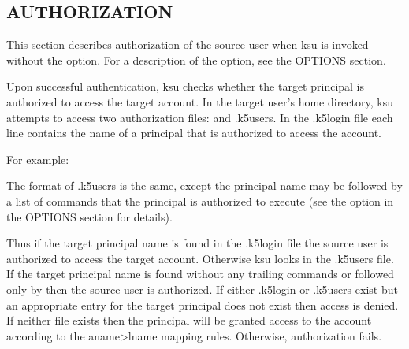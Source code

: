 \documentclass[letterpaper,10pt,english]{sphinxmanual}
\begin{document}
\subsection{AUTHORIZATION}
\label{\detokenize{user/user_commands/ksu:authorization}}
\sphinxAtStartPar
This section describes authorization of the source user when ksu is
invoked without the  option.  For a description of the 
option, see the OPTIONS section.

\sphinxAtStartPar
Upon successful authentication, ksu checks whether the target
principal is authorized to access the target account.  In the target
user’s home directory, ksu attempts to access two authorization files:
{\hyperref[\detokenize{user/user_config/k5login:k5login-5}]{}} and .k5users.  In the .k5login file each line
contains the name of a principal that is authorized to access the
account.

\sphinxAtStartPar
For example:

\begin{sphinxVerbatim}[commandchars=\\\{\}]
\end{sphinxVerbatim}

\sphinxAtStartPar
The format of .k5users is the same, except the principal name may be
followed by a list of commands that the principal is authorized to
execute (see the  option in the OPTIONS section for details).

\sphinxAtStartPar
Thus if the target principal name is found in the .k5login file the
source user is authorized to access the target account.  Otherwise ksu
looks in the .k5users file.  If the target principal name is found
without any trailing commands or followed only by \sphinxcode{\sphinxupquote{*}} then the
source user is authorized.  If either .k5login or .k5users exist but
an appropriate entry for the target principal does not exist then
access is denied.  If neither file exists then the principal will be
granted access to the account according to the aname\sphinxhyphen{}\textgreater{}lname mapping
rules.  Otherwise, authorization fails.
\end{document}
